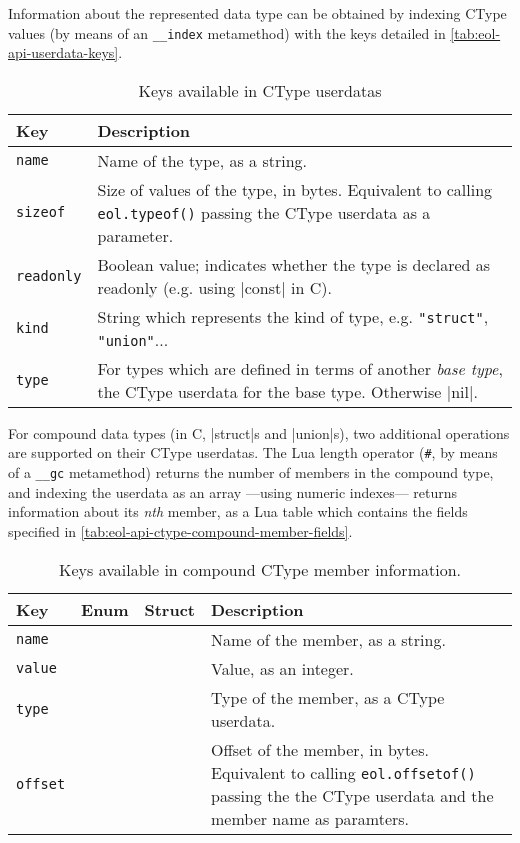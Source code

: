 Information about the represented data type can be obtained by indexing
\textsf{CType} values (by means of an \texttt{\_\_index} metamethod) with the
keys detailed in \autoref{tab:eol-api-userdata-keys}.

\begin{table}[ht]
	\centering
	\begin{tabular}{lp{}}
		\toprule
		Key & Description \\
		\midrule
		\texttt{name} & Name of the type, as a string. \\
		\texttt{sizeof} & Size of values of the type, in bytes. Equivalent to
			calling \texttt{eol.typeof()} passing the \textsf{CType} userdata as
			a parameter. \\
		\texttt{readonly} & Boolean value; indicates whether the type is
			declared as readonly (e.g. using \Mc|const| in C). \\
		\texttt{kind} & String which represents the kind of type, e.g.
			\texttt{"struct"}, \texttt{"union"}... \\
		\texttt{type} & For types which are defined in terms of another
			\emph{base type}, the \textsf{CType} userdata for the base type.
			Otherwise \Mlua|nil|. \\
		\bottomrule
	\end{tabular}
	\caption{Keys available in \textsf{CType} userdatas}
	\label{tab:eol-api-userdata-keys}
\end{table}

For compound data types (in C, \Mc|struct|s and \Mc|union|s), two additional
operations are supported on their \textsf{CType} userdatas. The Lua length
operator (\texttt\#, by means of a \texttt{\_\_gc} metamethod) returns the
number of members in the compound type, and indexing the userdata as an array
—using numeric indexes— returns information about its \emph{nth} member, as
a Lua table which contains the fields specified in
\autoref{tab:eol-api-ctype-compound-member-fields}.

\begin{table}[ht]
	\centering
	\begin{tabular}{lccp{}}
		\toprule
		Key & Enum & Struct & Description\\
		\midrule
		\texttt{name}  & \Tick & \Tick & Name of the member, as a string. \\
		\texttt{value} & \Tick &       & Value, as an integer. \\
		\texttt{type}  &       & \Tick & Type of the member, as a \textsf{CType} userdata. \\
		\texttt{offset}&       & \Tick & Offset of the member, in bytes.
			Equivalent to calling \texttt{eol.offsetof()} passing the the
			\textsf{CType} userdata and the member name as paramters. \\
		\bottomrule
	\end{tabular}
	\caption{Keys available in compound \textsf{CType} member information.}
	\label{tab:eol-api-ctype-compound-member-fields}
\end{table}


